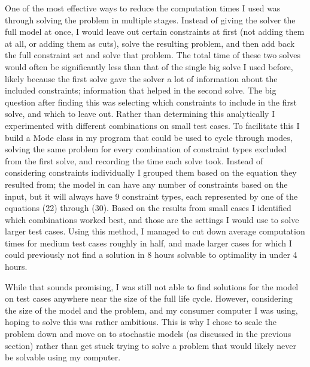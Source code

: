 \documentclass[a4paper,12pt]{article}
\begin{document}
One of the most effective ways to reduce the computation times I used was through solving the problem in multiple stages. Instead of giving the solver the full model at once, I would leave out certain constraints at first (not adding them at all, or adding them as cuts), solve the resulting problem, and then add back the full constraint set and solve that problem. The total time of these two solves would often be significantly less than that of the single big solve I used before, likely because the first solve gave the solver a lot of information about the included constraints; information that helped in the second solve. The big question after finding this was selecting which constraints to include in the first solve, and which to leave out. Rather than determining this analytically I experimented with different combinations on small test cases. To facilitate this I build a Mode class in my program that could be used to cycle through modes, solving the same problem for every combination of constraint types excluded from the first solve, and recording the time each solve took. Instead of considering constraints individually I grouped them based on the equation they resulted from; the model in  can have any number of constraints based on the input, but it will always have 9 constraint types, each represented by one of the equations (22) through (30). Based on the results from small cases I identified which combinations worked best, and those are the settings I would use to solve larger test cases. Using this method, I managed to cut down average computation times for medium test cases roughly in half, and made larger cases for which I could previously not find a solution in 8 hours solvable to optimality in under 4 hours. 

While that sounds promising, I was still not able to find solutions for the model on test cases anywhere near the size of the full life cycle. However, considering the size of the model and the problem, and my consumer computer I was using, hoping to solve this was rather ambitious. This is why I chose to scale the problem down and move on to stochastic models (as discussed in the previous section) rather than get stuck trying to solve a problem that would likely never be solvable using my computer. 
\end{document}
